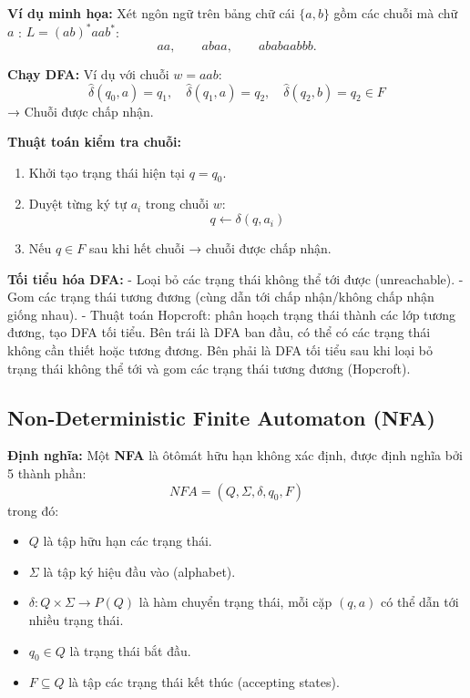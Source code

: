 \documentclass[12pt,a4paper]{report}
\begin{document}
\textbf{Ví dụ minh họa:} Xét ngôn ngữ trên bảng chữ cái $\{a, b\}$ gồm các chuỗi mà
chữ $a$ :  $L=(ab)^{*}aa b^{*}$:
\[
aa,\qquad abaa,\qquad ababaa bbb.
\]



\begin{center}
\end{center}

\textbf{Chạy DFA:}  
Ví dụ với chuỗi $w = aab$:
\[
\hat{\delta}(q_0, a) = q_1, \quad \hat{\delta}(q_1, a) = q_2, \quad \hat{\delta}(q_2, b) = q_2 \in F
\]
→ Chuỗi được chấp nhận.

\textbf{Thuật toán kiểm tra chuỗi:}  
\begin{enumerate}
    \item Khởi tạo trạng thái hiện tại $q = q_0$.
    \item Duyệt từng ký tự $a_i$ trong chuỗi $w$:
    \[
        q \leftarrow \delta(q, a_i)
    \]
    \item Nếu $q \in F$ sau khi hết chuỗi → chuỗi được chấp nhận.
\end{enumerate}

\textbf{Tối tiểu hóa DFA:}  
- Loại bỏ các trạng thái không thể tới được (unreachable).
- Gom các trạng thái tương đương (cùng dẫn tới chấp nhận/không chấp nhận giống nhau).
- Thuật toán Hopcroft: phân hoạch trạng thái thành các lớp tương đương, tạo DFA tối tiểu.
Bên trái là DFA ban đầu, có thể có các trạng thái không cần thiết hoặc tương đương.  
Bên phải là DFA tối tiểu sau khi loại bỏ trạng thái không thể tới và gom các trạng thái tương đương (Hopcroft).

\subsection{Non-Deterministic Finite Automaton (NFA)}

\textbf{Định nghĩa:}  
Một \textbf{NFA} là ôtômát hữu hạn không xác định, được định nghĩa bởi 5 thành phần:
\[
NFA = (Q, \Sigma, \delta, q_0, F)
\]
trong đó:
\begin{itemize}
    \item $Q$ là tập hữu hạn các trạng thái.
    \item $\Sigma$ là tập ký hiệu đầu vào (alphabet).
    \item $\delta: Q \times \Sigma \rightarrow P(Q)$ là hàm chuyển trạng thái, mỗi cặp $(q, a)$ có thể dẫn tới nhiều trạng thái.
    \item $q_0 \in Q$ là trạng thái bắt đầu.
    \item $F \subseteq Q$ là tập các trạng thái kết thúc (accepting states).
\end{itemize}
\end{document}
